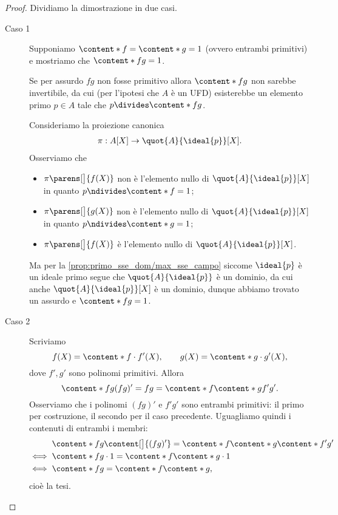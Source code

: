 \begin{proof}
    Dividiamo la dimostrazione in due casi.
    \begin{description}
        \item[Caso 1] Supponiamo $\content*{f} = \content*{g} = 1$ (ovvero entrambi primitivi) e mostriamo che $\content*{fg} = 1$.
        
        Se per assurdo $fg$ non fosse primitivo allora $\content*{fg}$ non sarebbe invertibile, da cui (per l'ipotesi che $A$ è un UFD) esisterebbe un elemento primo $p \in A$ tale che $p \divides \content*{fg}$.

        Consideriamo la proiezione canonica \begin{align*}
            \pi : A[X] \to \quot{A}{\ideal{p}}[X].
        \end{align*}
        Osserviamo che \begin{itemize}
            \item $\pi\parens[\big]{f(X)}$ non è l'elemento nullo di $\quot{A}{\ideal{p}}[X]$ in quanto $p \ndivides \content*{f} = 1$;
            \item $\pi\parens[\big]{g(X)}$ non è l'elemento nullo di $\quot{A}{\ideal{p}}[X]$ in quanto $p \ndivides \content*{g} = 1$;
            \item $\pi\parens[\big]{f(X)}$ è l'elemento nullo di $\quot{A}{\ideal{p}}[X]$.
        \end{itemize}
        Ma per la \autoref{prop:primo_sse_dom/max_sse_campo} siccome $\ideal{p}$ è un ideale primo segue che $\quot{A}{\ideal{p}}$ è un dominio, da cui anche $\quot{A}{\ideal{p}}[X]$ è un dominio, dunque abbiamo trovato un assurdo e $\content*{fg} = 1$.
        \item[Caso 2] Scriviamo \[
            f(X) = \content*{f}\cdot f'(X), \qquad g(X) = \content*{g}\cdot g'(X),
        \] dove $f', g'$ sono polinomi primitivi. Allora \[
            \content*{fg}(fg)' = fg = \content*{f}\content*{g}f'g'.    
        \] Osserviamo che i polinomi $(fg)'$ e $f'g'$ sono entrambi primitivi: il primo per costruzione, il secondo per il caso precedente.
        Uguagliamo quindi i contenuti di entrambi i membri: \begin{align*}
            &\content*{fg} \content[\big]{(fg)'} = \content*{f}\content*{g}\content*{f'g'}\\
            \iff {}&\content*{fg} \cdot 1 = \content*{f}\content*{g} \cdot 1\\
            \iff {}&\content*{fg} = \content*{f}\content*{g},
        \end{align*}
        cioè la tesi.
    \end{description}
\end{proof}

